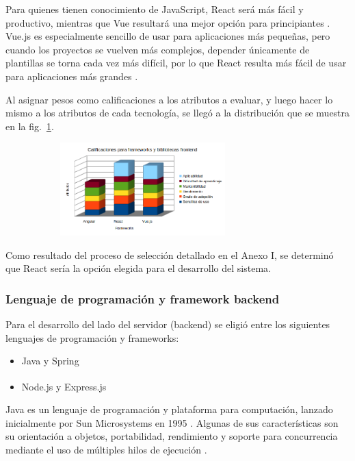 \documentclass[twoside]{article}
\begin{document}
Para quienes tienen conocimiento de JavaScript, React será más fácil y productivo, mientras que Vue resultará una mejor opción para principiantes \parencite{digitalya}. Vue.js es especialmente sencillo de usar para aplicaciones más pequeñas, pero cuando los proyectos se vuelven más complejos, depender únicamente de plantillas se torna cada vez más difícil, por lo que React resulta más fácil de usar para aplicaciones más grandes \parencite{stxnext}.

Al asignar pesos como calificaciones a los atributos a evaluar, y luego hacer lo mismo a los atributos de cada tecnología, se llegó a la distribución que se muestra en la fig.~\ref{fig:frameworksFrontend}.
\begin{figure}[H]
	\caption{Gráfico de calificaciones para frameworks y bibliotecas frontend}
    \begin{subfigure}{1\textwidth}
	\includegraphics[width=0.7\textwidth]{calificaciones para frameworks frontend.png}
    \end{subfigure}
	\label{fig:frameworksFrontend}
\end{figure}
\vspace{-1.0\baselineskip}
Como resultado del proceso de selección detallado en el Anexo I, se determinó que React sería la opción elegida para el desarrollo del sistema.
\subsubsection{Lenguaje de programación y framework backend}
Para el desarrollo del lado del servidor (backend) se eligió entre los siguientes lenguajes de programación y frameworks:
\begin{itemize}
    \item Java y Spring
    \item Node.js\textsuperscript{\textregistered} y Express.js
\end{itemize}
Java es un lenguaje de programación y plataforma para computación, lanzado inicialmente por Sun Microsystems en 1995 \parencite{whatIsJava}. Algunas de sus características son su orientación a objetos, portabilidad, rendimiento y soporte para concurrencia mediante el uso de múltiples hilos de ejecución \parencite{featuresJava}.
\end{document}
